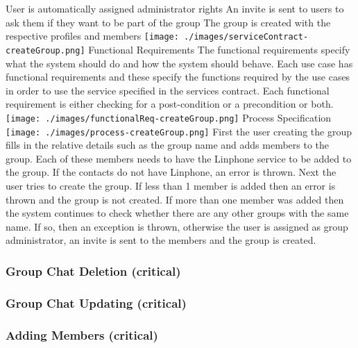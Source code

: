 \documentclass[11pt]{article}
\begin{document}
\newline
\bullet	User is automatically assigned administrator rights\newline
\bullet	An invite is sent to users to ask them if they want to be part of the group\newline
\bullet	The group is created with the respective profiles and members \newline
\newline
\texttt{[image: ./images/serviceContract-createGroup.png]}
\newline
Functional Requirements\newline
 The functional requirements specify what the system should do and how the system should behave. Each use case has functional requirements and these specify the functions required by the use cases in order to use the service specified in the services contract. Each functional requirement is either checking for a post-condition or a precondition or both.\newline
 \newline
\texttt{[image: ./images/functionalReq-createGroup.png]}
 \newline
Process Specification \newline
 \newline
 \texttt{[image: ./images/process-createGroup.png]}
  \newline
 First the user creating the group fills in the relative details such as the group name and adds members to the group. Each of these members needs to have the Linphone service to be added to the group. If the contacts do not have Linphone, an error is thrown. Next the user tries to create the group. If less than 1 member is added then an error is thrown and the group is not created. If more than one member was added then the system continues to check whether there are any other groups with the same name. If so, then an exception is thrown, otherwise the user is assigned as group administrator, an invite is sent to the members and the group is created.
 \newline
\subsubsection{Group Chat Deletion (critical)}
\subsubsection{Group Chat Updating (critical)}
\subsubsection{Adding Members (critical)}
\end{document}
